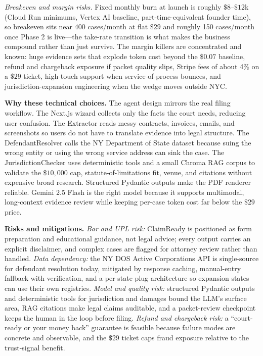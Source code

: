 \documentclass[11pt]{article}
\begin{document}
{\itshape Breakeven and margin risks.} Fixed monthly burn at launch is roughly \(\$8\)--\(\$12\)k (Cloud Run minimums, Vertex AI baseline, part-time-equivalent founder time), so breakeven sits near 400 cases/month at flat \(\$29\) and roughly 150 cases/month once Phase 2 is live---the take-rate transition is what makes the business compound rather than just survive. The margin killers are concentrated and known: huge evidence sets that explode token cost beyond the \(\$0.07\) baseline, refund and chargeback exposure if packet quality slips, Stripe fees of about 4\% on a \(\$29\) ticket, high-touch support when service-of-process bounces, and jurisdiction-expansion engineering when the wedge moves outside NYC.

{\bfseries Why these technical choices.} The agent design mirrors the real filing workflow. The Next.js wizard collects only the facts the court needs, reducing user confusion. The Extractor reads messy contracts, invoices, emails, and screenshots so users do not have to translate evidence into legal structure. The DefendantResolver calls the NY Department of State dataset because suing the wrong entity or using the wrong service address can sink the case. The JurisdictionChecker uses deterministic tools and a small Chroma RAG corpus to validate the \(\$10{,}000\) cap, statute-of-limitations fit, venue, and citations without expensive broad research. Structured Pydantic outputs make the PDF renderer reliable. Gemini 2.5 Flash is the right model because it supports multimodal, long-context evidence review while keeping per-case token cost far below the \(\$29\) price.

{\bfseries Risks and mitigations.} \textit{Bar and UPL risk:} ClaimReady is positioned as form preparation and educational guidance, not legal advice; every output carries an explicit disclaimer, and complex cases are flagged for attorney review rather than handled. \textit{Data dependency:} the NY DOS Active Corporations API is single-source for defendant resolution today, mitigated by response caching, manual-entry fallback with verification, and a per-state plug architecture so expansion states can use their own registries. \textit{Model and quality risk:} structured Pydantic outputs and deterministic tools for jurisdiction and damages bound the LLM's surface area, RAG citations make legal claims auditable, and a packet-review checkpoint keeps the human in the loop before filing. \textit{Refund and chargeback risk:} a ``court-ready or your money back'' guarantee is feasible because failure modes are concrete and observable, and the \(\$29\) ticket caps fraud exposure relative to the trust-signal benefit.
\end{document}
